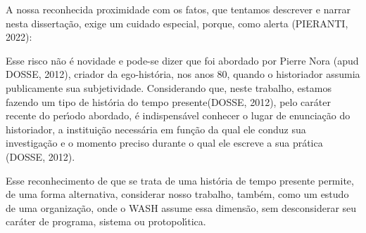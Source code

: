 \documentclass[
12pt,		%
openright,	%
twoside,  %
a4paper,			%
chapter=TITLE,		%
english,			%
french,				%
spanish,			%
brazil				%
]{USPSC-classe/USPSC}
\begin{document}
A nossa reconhecida proximidade com os fatos, que tentamos descrever e narrar nesta disserta\c{c}\~ao, exige um cuidado especial, porque, como alerta  (PIERANTI, 2022):


















\noindent\begin{center}\mbox{\centering{}}\end{center}


Esse risco n\~ao \'e novidade e pode-se dizer que foi abordado por Pierre Nora  (apud DOSSE, 2012), criador da ego-hist\'oria, nos anos 80, quando o historiador assumia publicamente sua subjetividade. Considerando que, neste trabalho, estamos fazendo um tipo de \textquotedbl hist\'oria do tempo presente\textquotedbl   (DOSSE, 2012), pelo car\'ater recente do per\'{\i}odo abordado, \'e indispens\'avel \textquotedbl conhecer o lugar de enuncia\c{c}\~ao do historiador, a institui\c{c}\~ao necess\'aria em fun\c{c}\~ao da qual ele conduz sua investiga\c{c}\~ao e o momento preciso durante o qual ele escreve a sua pr\'atica \textquotedbl   (DOSSE, 2012).

















Esse reconhecimento de que se trata de uma hist\'oria de tempo presente permite, de uma forma alternativa, considerar nosso trabalho, tamb\'em, como um estudo de uma organiza\c{c}\~ao, onde o WASH assume essa dimens\~ao, sem desconsiderar seu car\'ater de  programa, sistema ou protopol\'{\i}tica.
\end{document}
